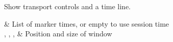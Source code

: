 Show transport controls and a time line.

\begin{tscattributes}
     & List of marker times, or empty to use session time                            \\
, , ,  & Position and size of window\\
\end{tscattributes}
